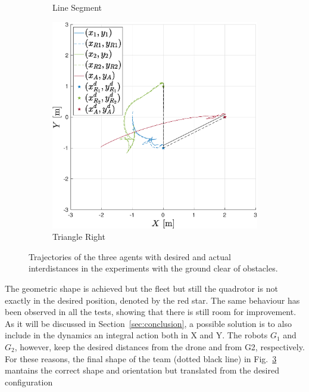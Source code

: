 \documentclass{ifacconf}
\begin{document}
\begin{figure}
\begin{subfigure}[b]{0.31\columnwidth}
      \caption{Line Segment}
      \label{fig:exp_noObstacles_2}
   \end{subfigure}
    \begin{subfigure}[b]{0.31\columnwidth}
        \centering
        \includegraphics[width=\linewidth]{images/experiment/nominal/3rd_scenario_exp_bigger.eps}
        \caption{Triangle Right}
        \label{fig:exp_noObstacles_3}
      \end{subfigure}
   \vspace{-0.2cm}
   \caption{Trajectories of the three agents with desired and actual interdistances 
   in the experiments with the ground clear of obstacles.}
   \label{fig:exp_noObstacles}
\end{figure}
The geometric shape is achieved but the fleet but still 
the quadrotor is not exactly in the desired position, denoted by the red star.
The same behaviour has been observed in all the tests, showing that there 
is still room for improvement.
As it will be discussed in Section~\ref{sec:conclusion}, a possible solution is to also include 
in the dynamics an integral action both in X and Y.
The robots $G_1$ and $G_2$, however, keep the desired distances from the drone and from G2, 
respectively.
For these reasons, the final shape of the team (dotted black line) in Fig.~\ref{fig:exp_noObstacles}
mantains the correct shape and orientation but translated from the desired configuration 
\end{document}
